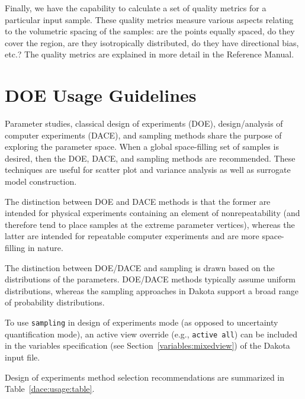 Finally, we have the capability to calculate a set of quality metrics 
for a particular input sample. These quality metrics measure 
various aspects relating to the volumetric spacing of the samples: 
are the points equally spaced, do they cover the region, are they 
isotropically distributed, do they have directional bias, etc.? 
The quality metrics are explained in more detail in the Reference Manual.

\section{DOE Usage Guidelines}\label{dace:usage}

Parameter studies, classical design of experiments (DOE),
design/analysis of computer experiments (DACE), and sampling methods
share the purpose of exploring the parameter space. When a global
space-filling set of samples is desired, then the DOE, DACE, and
sampling methods are recommended. These techniques are useful for
scatter plot and variance analysis as well as surrogate model
construction. 

The distinction between DOE and DACE methods is that the
former are intended for physical experiments containing an element of
nonrepeatability (and therefore tend to place samples at the extreme
parameter vertices), whereas the latter are intended for repeatable
computer experiments and are more space-filling in nature. 

The distinction between DOE/DACE and sampling is drawn based on the
distributions of the parameters. DOE/DACE methods typically assume
uniform distributions, whereas the sampling approaches in Dakota
support a broad range of probability distributions. 

To use \texttt{sampling} in design of experiments mode (as opposed to
uncertainty quantification mode), an active view override (e.g.,
\texttt{active all}) can be included in the variables specification
(see Section~\ref{variables:mixedview}) of the Dakota input file.

Design of experiments method selection recommendations are summarized
in Table~\ref{dace:usage:table}.

